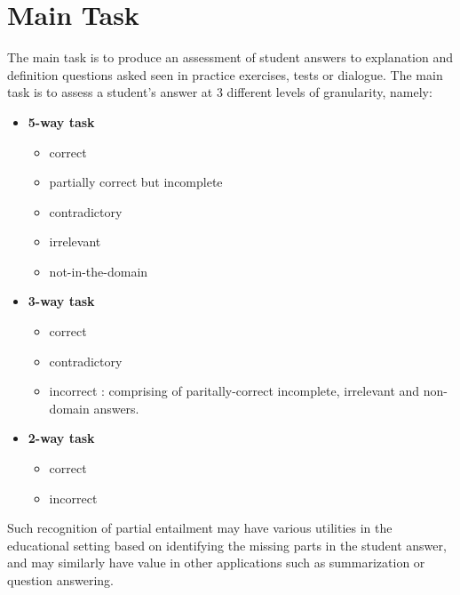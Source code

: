 \documentclass[a4paper]{article}
\begin{document}
\section{Main Task}
The main task is to produce an assessment of student answers to explanation and definition questions asked seen in practice exercises, tests or dialogue. The main task is to assess a student's answer at 3 different levels of granularity, namely:
\begin{itemize}
	\item \textbf{5-way task} 
	\begin{itemize}
	\item correct
	\item partially correct but incomplete
	\item contradictory
	\item irrelevant
	\item not-in-the-domain
	\end{itemize}
	\item \textbf{3-way task}
	\begin{itemize}
	\item correct
	\item contradictory
	\item incorrect : comprising of paritally-correct incomplete, irrelevant and non-domain answers.
	\end{itemize}
	\item \textbf{2-way task}
	\begin{itemize}
	\item correct
	\item incorrect
	\end{itemize}
\end{itemize} 

Such recognition of partial entailment may have various utilities in the educational setting based on identifying the missing parts in the student answer, and may similarly have value in other applications such as summarization or question answering.
\end{document}
